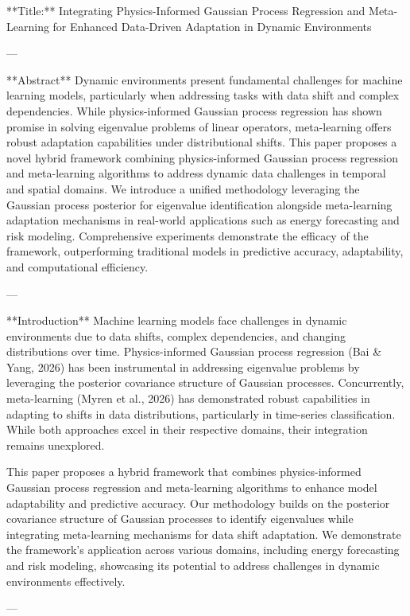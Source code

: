 **Title:** Integrating Physics-Informed Gaussian Process Regression and Meta-Learning for Enhanced Data-Driven Adaptation in Dynamic Environments  

---

**Abstract**  
Dynamic environments present fundamental challenges for machine learning models, particularly when addressing tasks with data shift and complex dependencies. While physics-informed Gaussian process regression has shown promise in solving eigenvalue problems of linear operators, meta-learning offers robust adaptation capabilities under distributional shifts. This paper proposes a novel hybrid framework combining physics-informed Gaussian process regression and meta-learning algorithms to address dynamic data challenges in temporal and spatial domains. We introduce a unified methodology leveraging the Gaussian process posterior for eigenvalue identification alongside meta-learning adaptation mechanisms in real-world applications such as energy forecasting and risk modeling. Comprehensive experiments demonstrate the efficacy of the framework, outperforming traditional models in predictive accuracy, adaptability, and computational efficiency.  

---

**Introduction**  
Machine learning models face challenges in dynamic environments due to data shifts, complex dependencies, and changing distributions over time. Physics-informed Gaussian process regression (Bai & Yang, 2026) has been instrumental in addressing eigenvalue problems by leveraging the posterior covariance structure of Gaussian processes. Concurrently, meta-learning (Myren et al., 2026) has demonstrated robust capabilities in adapting to shifts in data distributions, particularly in time-series classification. While both approaches excel in their respective domains, their integration remains unexplored.

This paper proposes a hybrid framework that combines physics-informed Gaussian process regression and meta-learning algorithms to enhance model adaptability and predictive accuracy. Our methodology builds on the posterior covariance structure of Gaussian processes to identify eigenvalues while integrating meta-learning mechanisms for data shift adaptation. We demonstrate the framework's application across various domains, including energy forecasting and risk modeling, showcasing its potential to address challenges in dynamic environments effectively.

---

